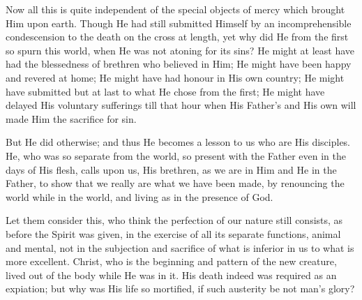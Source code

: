 Now all this is quite independent of the special objects of mercy
which brought Him upon earth. Though He had still submitted Himself by
an incomprehensible condescension to the death on the cross at length,
yet why did He from the first so spurn this world, when He was not
atoning for its sins? He might at least have had the blessedness of
brethren who believed in Him; He might have been happy and revered at
home; He might have had honour in His own country; He might have
submitted but at last to what He chose from the first; He might have
delayed His voluntary sufferings till that hour when His Father's and
His own will made Him the sacrifice for sin.

But He did otherwise; and thus He becomes a lesson to us who are
His disciples. He, who was so separate from the world, so present with
the Father even in the days of His flesh, calls upon us, His brethren,
as we are in Him and He in the Father, to show that we really are what
we have been made, by renouncing the world while in the world, and
living as in the presence of God.

Let them consider this, who think the perfection of our nature
still consists, as before the Spirit was given, in the exercise of all
its separate functions, animal and mental, not in the subjection and
sacrifice of what is inferior in us to what is more excellent. Christ,
who is the beginning and pattern of the new creature, lived out of the
body while He was in it. His death indeed was required as an
expiation; but why was His life so mortified, if such austerity be not
man's glory?

